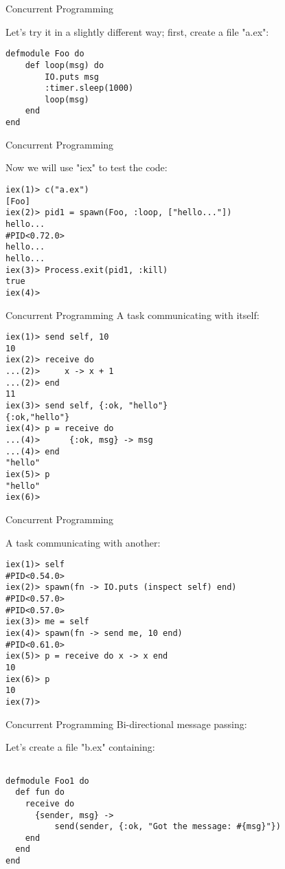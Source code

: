 \documentclass{beamer}
\begin{document}
\begin{frame}[fragile]{Concurrent Programming}

Let's try it in a slightly different way; first, create
a file "a.ex":

\begin{verbatim}
defmodule Foo do
    def loop(msg) do
        IO.puts msg
        :timer.sleep(1000)
        loop(msg)
    end
end
\end{verbatim}

\end{frame}
\begin{frame}[fragile]{Concurrent Programming}

Now we will use "iex" to test the code:

\begin{verbatim}
iex(1)> c("a.ex")
[Foo]
iex(2)> pid1 = spawn(Foo, :loop, ["hello..."])
hello...
#PID<0.72.0>
hello...
hello...
iex(3)> Process.exit(pid1, :kill)
true
iex(4)> 
\end{verbatim}


\end{frame}
\begin{frame}[fragile]{Concurrent Programming}
A task communicating with itself:

\begin{verbatim}
iex(1)> send self, 10
10
iex(2)> receive do
...(2)>     x -> x + 1
...(2)> end
11
iex(3)> send self, {:ok, "hello"}
{:ok,"hello"}
iex(4)> p = receive do
...(4)>      {:ok, msg} -> msg
...(4)> end
"hello"
iex(5)> p
"hello"
iex(6)> 
\end{verbatim}

\end{frame}
\begin{frame}[fragile]{Concurrent Programming}

A task communicating with another:
\begin{verbatim}
iex(1)> self
#PID<0.54.0>
iex(2)> spawn(fn -> IO.puts (inspect self) end)
#PID<0.57.0>
#PID<0.57.0>
iex(3)> me = self
iex(4)> spawn(fn -> send me, 10 end)
#PID<0.61.0>
iex(5)> p = receive do x -> x end
10
iex(6)> p
10
iex(7)> 
\end{verbatim}

\end{frame}

\begin{frame}[fragile]{Concurrent Programming}
Bi-directional message passing:

Let's create a file "b.ex" containing:
\begin{verbatim}

defmodule Foo1 do
  def fun do
    receive do
      {sender, msg} -> 
          send(sender, {:ok, "Got the message: #{msg}"})
    end
  end
end

\end{verbatim}

\end{frame}
\end{document}
